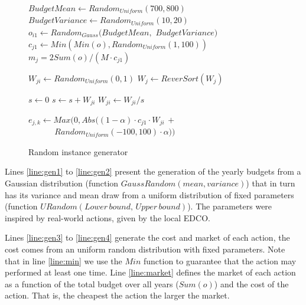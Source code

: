 \begin{figure}
\begin{algorithm}[H]
\begin{algorithmic}[1]
\State \label{line:gen1} $BudgetMean \gets Random_{\textit{Uniform}}(700,800)$
\State $BudgetVariance \gets Random_{\textit{Uniform}}(10,20)$
  \State $o_{i1} \gets Random_{\textit{Gauss}}(BudgetMean,$ $BudgetVariance)$
\EndFor \label{line:gen2}
\label{line:gen3}
  \State $c_{j1} \gets \label{line:min} Min(Min(o), Random_{\textit{Uniform}}(1,100))$
\EndFor
{}
  \State \label{line:market} $ m_j = 2 Sum(o) / (M \cdot c_{j1})$
\EndFor \label{line:gen4}

 \label{line:W1}
    \State $W_{ji} \gets Random_{\textit{Uniform}}(0,1)$
  \EndFor
  \State $W_{j} \gets ReverSort(W_{j})$
\EndFor

  \State $s \gets 0$
    \State $s \gets s + W_{ji}$
  \EndFor
    \State $W_{ji} \gets W_{ji}/s$
  \EndFor
\EndFor  \label{line:W2}

 \label{line:e1}
      \State \label{line:en} $e_{j,k} \gets Max(0, Abs((1-\alpha) \cdot c_{j1} \cdot W_{ji} \, +$
      \State $\qquad \quad \, Random_{\textit{Uniform}}(-100,100) \cdot \alpha))$
  \EndFor
\EndFor \label{line:e2}
\EndFunction
\end{algorithmic}
\caption{Random instance generator}
\label{alg:gen}
\end{algorithm}
\end{figure}

Lines \ref{line:gen1} to \ref{line:gen2} present the generation of the yearly budgets from a Gaussian
distribution (function $GaussRandom(mean, variance)$) that in turn has its variance and mean draw 
from a uniform distribution of fixed parameters (function $URandom(Lower\,bound,\,Upper\,bound)$).
The parameters were inspired by real-world actions, given by the local EDCO.

Lines \ref{line:gen3} to \ref{line:gen4} generate the cost and market of each action, the cost comes from
an uniform random distribution with fixed parameters. Note that in line \ref{line:min} we
use the $Min$ function to guarantee that the action may performed at least one time. Line \ref{line:market}
defines the market of each action as a function of the total budget over all years ($Sum(o)$) and the
cost of the action. That is, the cheapest the action the larger the market.

